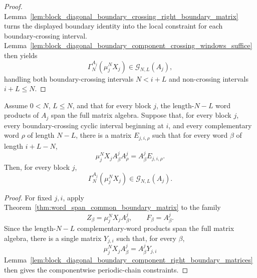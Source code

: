 \begin{proof}
    \leanok
    Lemma~\ref{lem:block_diagonal_boundary_crossing_right_boundary_matrix}
    turns the displayed boundary identity into the local constraint for each
    boundary-crossing interval.
    Lemma~\ref{lem:block_diagonal_boundary_component_crossing_windows_suffice}
    then yields
    \[
        \Gamma_N^{A_j}(\mu_j^NX_j)\in \mathcal G_{N,L}(A_j),
    \]
    handling both boundary-crossing intervals \(N<i+L\) and non-crossing
    intervals \(i+L\le N\).
\end{proof}

\begin{lemma}
    \label{lem:block_diagonal_boundary_component_complementary_word_identities}
    \leanok
    Assume \(0<N\), \(L\le N\), and that for every block \(j\), the
    length-\(N-L\) word products of \(A_j\) span the full matrix algebra. Suppose
    that, for every block \(j\), every boundary-crossing cyclic interval
    beginning at \(i\), and every complementary word
    \(\rho\) of length \(N-L\), there is a matrix \(E_{j,i,\rho}\) such
    that for every word \(\beta\) of length \(i+L-N\),
    \[
        \mu_j^N X_j A^j_\beta A^j_\rho
        =
        A^j_\beta E_{j,i,\rho}.
    \]
    Then, for every block \(j\),
    \[
        \Gamma_N^{A_j}(\mu_j^NX_j)\in\mathcal G_{N,L}(A_j).
    \]
\end{lemma}

\begin{proof}
    \leanok
    For fixed \(j,i\), apply
    Theorem~\ref{thm:word_span_common_boundary_matrix} to the family
    \[
        Z_\beta=\mu_j^NX_jA^j_\beta,\qquad F_\beta=A^j_\beta.
    \]
    Since the length-\(N-L\) complementary-word products span the full matrix
    algebra, there is a single matrix \(Y_{j,i}\) such that, for every \(\beta\),
    \[
        \mu_j^NX_jA^j_\beta=A^j_\beta Y_{j,i}
    \]
    Lemma~\ref{lem:block_diagonal_boundary_component_right_boundary_matrices}
    then gives the componentwise periodic-chain constraints.
\end{proof}

